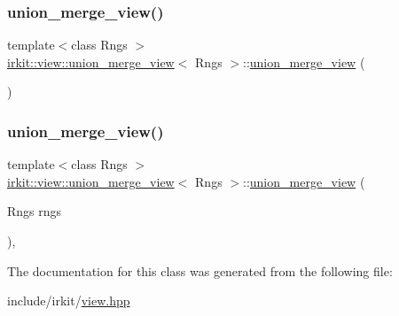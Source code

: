 \subsubsection{\texorpdfstring{union\+\_\+merge\+\_\+view()}{union\_merge\_view()}\hspace{0.1cm}{\footnotesize\ttfamily [1/2]}}
{\footnotesize\ttfamily template$<$class Rngs $>$ \\
\mbox{\hyperlink{classirkit_1_1view_1_1union__merge__view}{irkit\+::view\+::union\+\_\+merge\+\_\+view}}$<$ Rngs $>$\+::\mbox{\hyperlink{classirkit_1_1view_1_1union__merge__view}{union\+\_\+merge\+\_\+view}} (\begin{DoxyParamCaption}{ }\end{DoxyParamCaption})\hspace{0.3cm}{\ttfamily [default]}}

\mbox{\label{classirkit_1_1view_1_1union__merge__view_af2e80cdce25cdfd8db01a868a4dbf964}} 
\subsubsection{\texorpdfstring{union\+\_\+merge\+\_\+view()}{union\_merge\_view()}\hspace{0.1cm}{\footnotesize\ttfamily [2/2]}}
{\footnotesize\ttfamily template$<$class Rngs $>$ \\
\mbox{\hyperlink{classirkit_1_1view_1_1union__merge__view}{irkit\+::view\+::union\+\_\+merge\+\_\+view}}$<$ Rngs $>$\+::\mbox{\hyperlink{classirkit_1_1view_1_1union__merge__view}{union\+\_\+merge\+\_\+view}} (\begin{DoxyParamCaption}\item[{Rngs}]{rngs }\end{DoxyParamCaption})\hspace{0.3cm}{\ttfamily [inline]}, {\ttfamily [explicit]}}



The documentation for this class was generated from the following file\+:\begin{DoxyCompactItemize}
\item 
include/irkit/\mbox{\hyperlink{view_8hpp}{view.\+hpp}}\end{DoxyCompactItemize}
